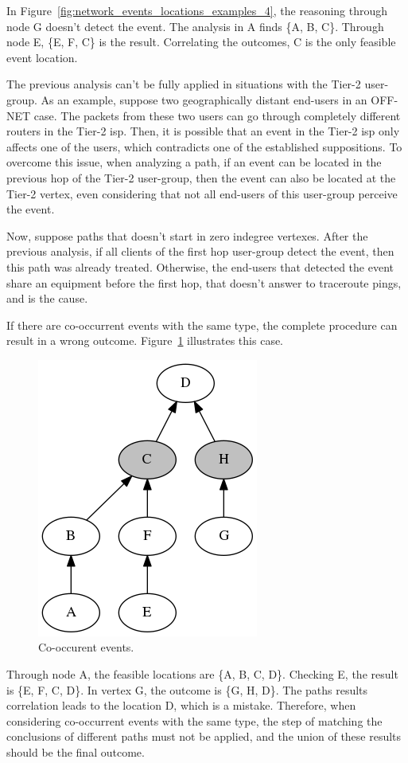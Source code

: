 In Figure~\ref{fig:network_events_locations_examples_4}, the reasoning through
node G doesn't detect the event. The analysis in A finds \{A, B, C\}. Through
node E, \{E, F, C\} is the result.
Correlating the outcomes, C is the only feasible event location.

The previous analysis can't be fully applied in situations with the Tier-2
user-group.
As an example, suppose two geographically distant end-users in an OFF-NET case.
The packets from these two users can go through completely different routers in
the Tier-2 \gls*{isp}\@. Then, it is possible that an event in the Tier-2 \gls*{isp} only
affects one of the users, which contradicts one of the established suppositions.
To overcome this issue, when analyzing a path, if an event can be located in the
previous hop of the Tier-2 user-group, then the event can also be located at
the Tier-2 vertex, even considering that not all end-users of this user-group
perceive the event.

Now, suppose paths that doesn't start in zero indegree vertexes.
After the previous analysis,
if all clients of the first hop user-group detect the event, then this
path was already treated. Otherwise, the end-users that detected the event
share an equipment before the first hop,
that doesn't answer to traceroute pings, and is the cause.

If there are co-occurrent events with the same type, the complete procedure can
result in a wrong outcome. Figure~\ref{fig:network_events_locations_examples_5}
illustrates this case.

\begin{figure}[H]
    \centering
    \includegraphics[width=0.35\linewidth]{./figures/methodology/spatial_time_correlation/event_tree_graph_5.png}
    \caption{Co-occurent events.}
\label{fig:network_events_locations_examples_5}
\end{figure}%

Through node A, the feasible locations are \{A, B, C, D\}.
Checking E, the result is \{E, F, C, D\}.
In vertex G, the outcome is \{G, H, D\}.
The paths results correlation leads to the location D, which is a mistake.
Therefore, when considering co-occurrent events with the same type, the step of
matching the conclusions of different paths must not be applied, and the
union of these results should be the final outcome.

